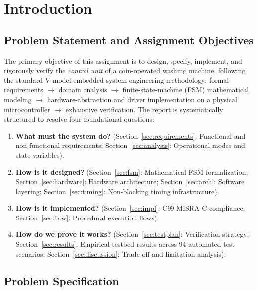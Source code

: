 \section{Introduction}
\label{sec:intro}

\subsection{Problem Statement and Assignment Objectives}

The primary objective of this assignment is to design, specify, implement, and rigorously verify the
\emph{control unit} of a coin-operated washing machine, following the standard V-model embedded-system
engineering methodology: formal requirements $\rightarrow$ domain analysis $\rightarrow$ finite-state-machine
(FSM) mathematical modeling $\rightarrow$ hardware-abstraction and driver implementation on a physical
microcontroller $\rightarrow$ exhaustive verification. The report is systematically structured to resolve four
foundational questions:

\begin{enumerate}
  \item \textbf{What must the system do?} (Section~\ref{sec:requirements}: Functional and non-functional requirements; Section~\ref{sec:analysis}: Operational modes and state variables).
  \item \textbf{How is it designed?} (Section~\ref{sec:fsm}: Mathematical FSM formalization; Section~\ref{sec:hardware}: Hardware architecture; Section~\ref{sec:arch}: Software layering; Section~\ref{sec:timing}: Non-blocking timing infrastructure).
  \item \textbf{How is it implemented?} (Section~\ref{sec:impl}: C99 MISRA-C compliance; Section~\ref{sec:flow}: Procedural execution flows).
  \item \textbf{How do we prove it works?} (Section~\ref{sec:testplan}: Verification strategy; Section~\ref{sec:results}: Empirical testbed results across 94 automated test scenarios; Section~\ref{sec:discussion}: Trade-off and limitation analysis).
\end{enumerate}

\subsection{Problem Specification}

